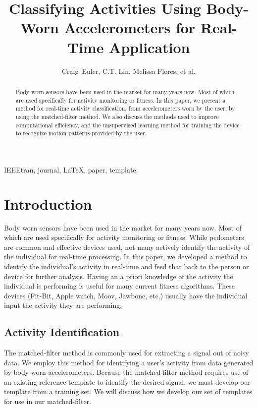 \documentclass[journal]{IEEEtran}
\begin{document}
%
\title{Classifying Activities Using Body-Worn Accelerometers for Real-Time Application}
%
\author{Craig~Euler, C.T. Lin, Melissa Flores, et al.}
%
\maketitle
%
\begin{abstract}
Body worn sensors have been used in the market for many years now. Most of which are used specifically for activity monitoring or fitness. In this paper, we present a method for real-time activity classification, from accelerometers worn by the user, by using the matched-filter method. We also discuss the methods used to improve computational efficiency, and the unsupervised learning method for training the device to recognize motion patterns provided by the user.
\end{abstract}
%
\begin{IEEEkeywords}
IEEEtran, journal, \LaTeX, paper, template.
\end{IEEEkeywords}
\IEEEpeerreviewmaketitle
%
\section{Introduction}
Body worn sensors have been used in the market for many years now. Most of which are used specifically for activity monitoring or fitness. While pedometers are common and effective devices used, not many actively identify the activity of the individual for real-time processing. In this paper, we developed a method to identify the individual’s activity in real-time and feed that back to the person or device for further analysis. Having an a priori knowledge of the activity the individual is performing is useful for many current fitness algorithms. These devices (Fit-Bit, Apple watch, Moov, Jawbone, etc.) usually have the individual input the activity they are performing.
%
\subsection{Activity Identification}
The matched-filter method is commonly used for extracting a signal out of noisy data. We employ this method for identifying a user’s activity from data generated by body-worn accelerometers. Because the matched-filter method requires use of an existing reference template to identify the desired signal, we must develop our template from a training set. We will discuss how we develop our set of templates for use in our matched-filter.
%
\end{document}
